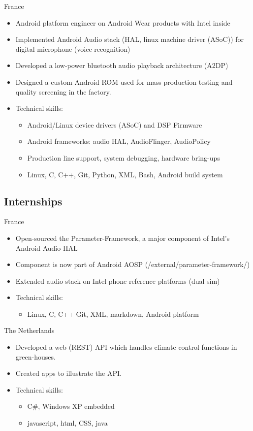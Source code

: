 \documentclass[a4paper,10pt,sans]{moderncv}
\begin{document}
{}{France}
{
    \begin{itemize}
    \item Android platform engineer on Android Wear products with Intel inside
    \item Implemented Android Audio stack (HAL, linux machine driver (ASoC)) for digital microphone (voice recognition)
    \item Developed a low-power bluetooth audio playback architecture (A2DP)
    \item Designed a custom Android ROM used for mass production testing and quality screening in the factory.
    \item Technical skills:
      \begin{itemize}
        \item Android/Linux device drivers (ASoC) and DSP Firmware
        \item Android frameworks: audio HAL, AudioFlinger, AudioPolicy
        \item Production line support, system debugging, hardware bring-ups
        \item Linux, C, C++, Git, Python, XML, Bash, Android build system
      \end{itemize}
    \end{itemize}
}

\subsection{Internships}
{}{France}
{
  \begin{itemize}
    \item Open-sourced the Parameter-Framework, a major component of Intel's Android Audio HAL
    \item Component is now part of Android AOSP (/external/parameter-framework/)
    \item Extended audio stack on Intel phone reference platforms (dual sim)
    \item Technical skills:
    \begin{itemize}
      \item Linux, C, C++ Git, XML, markdown, Android platform
    \end{itemize}
  \end{itemize}
}

{}{The Netherlands}
{
  \begin{itemize}
    \item Developed a web (REST) API which handles climate control functions in green-houses.
    \item Created apps to illustrate the API.
    \item Technical skills:
    \begin{itemize}
      \item C\#, Windows XP embedded
      \item javascript, html, CSS, java
    \end{itemize}
  \end{itemize}
}
\end{document}
